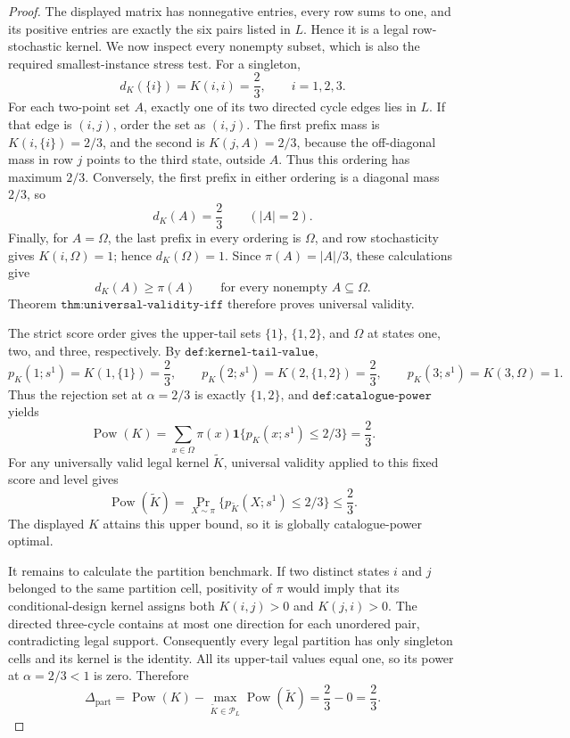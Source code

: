 \documentclass{article}
\begin{document}
\begin{proof}
The displayed matrix has nonnegative entries, every row sums to one, and its positive entries are exactly the six pairs listed in \(L\).  Hence it is a legal row-stochastic kernel.  We now inspect every nonempty subset, which is also the required smallest-instance stress test.  For a singleton,
\[
 d_K(\{i\})=K(i,i)=\frac23,\qquad i=1,2,3.
\]
For each two-point set \(A\), exactly one of its two directed cycle edges lies in \(L\).  If that edge is \((i,j)\), order the set as \((i,j)\).  The first prefix mass is \(K(i,\{i\})=2/3\), and the second is \(K(j,A)=2/3\), because the off-diagonal mass in row \(j\) points to the third state, outside \(A\).  Thus this ordering has maximum \(2/3\).  Conversely, the first prefix in either ordering is a diagonal mass \(2/3\), so
\[
 d_K(A)=\frac23\qquad (|A|=2).
\]
Finally, for \(A=\Omega\), the last prefix in every ordering is \(\Omega\), and row stochasticity gives \(K(i,\Omega)=1\); hence \(d_K(\Omega)=1\).  Since \(\pi(A)=|A|/3\), these calculations give
\[
 d_K(A)\geq \pi(A)\qquad\text{for every nonempty }A\subseteq\Omega.
\]
Theorem \(\texttt{thm:universal-validity-iff}\) therefore proves universal validity.

The strict score order gives the upper-tail sets \(\{1\}\), \(\{1,2\}\), and \(\Omega\) at states one, two, and three, respectively.  By \(\texttt{def:kernel-tail-value}\),
\[
 p_K(1;s^1)=K(1,\{1\})=\frac23,
 \qquad
 p_K(2;s^1)=K(2,\{1,2\})=\frac23,
 \qquad
 p_K(3;s^1)=K(3,\Omega)=1.
\]
Thus the rejection set at \(\alpha=2/3\) is exactly \(\{1,2\}\), and \(\texttt{def:catalogue-power}\) yields
\[
 \operatorname{Pow}(K)=\sum_{x\in\Omega}\pi(x)\mathbf 1\{p_K(x;s^1)\leq2/3\}=\frac23.
\]
For any universally valid legal kernel \(\widetilde K\), universal validity applied to this fixed score and level gives
\[
 \operatorname{Pow}(\widetilde K)
 =\Pr_{X\sim\pi}\{p_{\widetilde K}(X;s^1)\leq2/3\}
 \leq\frac23.
\]
The displayed \(K\) attains this upper bound, so it is globally catalogue-power optimal.

It remains to calculate the partition benchmark.  If two distinct states \(i\) and \(j\) belonged to the same partition cell, positivity of \(\pi\) would imply that its conditional-design kernel assigns both \(K(i,j)>0\) and \(K(j,i)>0\).  The directed three-cycle contains at most one direction for each unordered pair, contradicting legal support.  Consequently every legal partition has only singleton cells and its kernel is the identity.  All its upper-tail values equal one, so its power at \(\alpha=2/3<1\) is zero.  Therefore
\[
 \Delta_{\mathrm{part}}
 =\operatorname{Pow}(K)-\max_{\widetilde K\in\mathcal P_L}\operatorname{Pow}(\widetilde K)
 =\frac23-0=\frac23.
\]
\end{proof}
\end{document}
